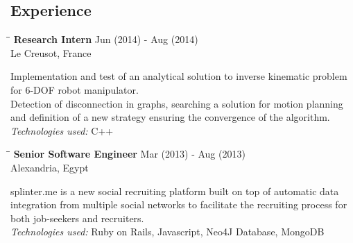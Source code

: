 \documentclass{res}
\begin{document}
\begin{resume}
\section{Experience}
   \vspace{-0.1in}
   \begin{tabbing}
   \hspace{2.7in}\= \hspace{1.8in}\= \kill %
   {\bf Research Intern}\> \hfill Jun (2014) - Aug (2014)\\
                                    \>Le Creusot, France
   \end{tabbing}\vspace{-20pt}      %
    Implementation and test of an analytical solution to inverse kinematic problem for 6-DOF robot manipulator.\\
    Detection of disconnection in graphs, searching a solution for motion planning and definition of a new strategy ensuring the convergence of the algorithm.\\
    {\sl Technologies used:}  C++

   \begin{tabbing}
   \hspace{2.7in}\= \hspace{1.8in}\= \kill %
    {\bf Senior Software Engineer}\> \hfill Mar (2013) - Aug (2013)\\
                                    \>Alexandria, Egypt
   \end{tabbing}\vspace{-20pt}      %
    splinter.me is a new social recruiting platform built on top of automatic data integration from multiple social networks to facilitate the recruiting process for both job-seekers and recruiters.\\
    {\sl Technologies used:} Ruby on Rails, Javascript, Neo4J Database, MongoDB


\end{resume}
\end{document}
